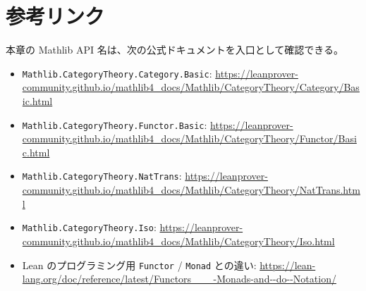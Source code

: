 \section{参考リンク}

本章の Mathlib API 名は、次の公式ドキュメントを入口として確認できる。

\begin{itemize}
\item \texttt{Mathlib.CategoryTheory.Category.Basic}: \url{https://leanprover-community.github.io/mathlib4_docs/Mathlib/CategoryTheory/Category/Basic.html}
\item \texttt{Mathlib.CategoryTheory.Functor.Basic}: \url{https://leanprover-community.github.io/mathlib4_docs/Mathlib/CategoryTheory/Functor/Basic.html}
\item \texttt{Mathlib.CategoryTheory.NatTrans}: \url{https://leanprover-community.github.io/mathlib4_docs/Mathlib/CategoryTheory/NatTrans.html}
\item \texttt{Mathlib.CategoryTheory.Iso}: \url{https://leanprover-community.github.io/mathlib4_docs/Mathlib/CategoryTheory/Iso.html}
\item Lean のプログラミング用 \texttt{Functor} / \texttt{Monad} との違い: \url{https://lean-lang.org/doc/reference/latest/Functors___-Monads-and--do--Notation/}
\end{itemize}
